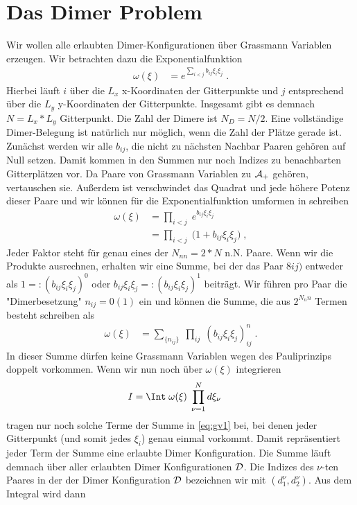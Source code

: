  
\section {Das Dimer Problem}

Wir wollen alle erlaubten Dimer-Konfigurationen über Grassmann Variablen erzeugen.
Wir betrachten dazu die Exponentialfunktion
\begin{align*}
    \omega(\xi) &= e^{\sum_{i<j} b_{ij} \xi_i\xi_j}\;.
\end{align*}
Hierbei läuft $i$ über die $L_x$ x-Koordinaten der Gitterpunkte und $j$ entsprechend über die 
$L_y$ y-Koordinaten der Gitterpunkte. Insgesamt gibt es demnach  $N=L_x*L_y$ Gitterpunkt. Die Zahl der Dimere ist $N_D=N/2$. Eine vollständige Dimer-Belegung ist
natürlich nur möglich, wenn die Zahl der Plätze gerade ist.
Zunächst werden wir alle $b_{ij}$, die nicht zu nächsten Nachbar Paaren gehören auf Null setzen. Damit kommen in den Summen nur noch Indizes zu 
benachbarten Gitterplätzen vor.
Da Paare von Grassmann Variablen  zu ${\cal A}_+$ gehören, vertauschen sie. Außerdem ist verschwindet das Quadrat und jede höhere 
Potenz dieser Paare und wir können für die Exponentialfunktion umformen in
schreiben
\begin{align*}
    \omega(\xi) &= \prod_{i<j}\; e^{b_{ij} \xi_i\xi_j}  \\
    &= \prod_{i<j}\;\bigg(1 + b_{ij}\xi_i\xi_j    \bigg)\;,
\end{align*}
Jeder Faktor steht für genau eines der $N_{nn}=2*N$ n.N. Paare.
Wenn wir die Produkte ausrechnen, erhalten 
wir eine Summe, bei der das Paar $8ij)$ entweder als $1=:(b_{ij} \xi_i\xi_j)^0$ oder $b_{ij} \xi_i\xi_j=:(b_{ij} \xi_i\xi_j)^1$ beiträgt. Wir führen
pro Paar die "Dimerbesetzung" $n_{ij}=0 (1)$ ein und können die Summe, die aus $2^{N_nn}$ Termen besteht schreiben als
\begin{align}\label{eq:gv1}
    \omega(\xi) &= \sum_{\{n_{ij} \}}\; \prod_{ij}\;(b_{ij}\xi_i\xi_j)^n_{ij}\;.
\end{align}
In dieser Summe dürfen keine Grassmann Variablen wegen des Pauliprinzips doppelt vorkommen.
Wenn wir nun noch über $\omega(\xi)$ integrieren
\begin{align*}
    I &=\Int\;\omega(\xi)\;\prod_{\nu=1}^N d\xi_\nu\;
\end{align*}
tragen nur noch solche Terme der Summe in \eqref{eq:gv1} bei, bei denen jeder Gitterpunkt (und somit jedes $\xi_i$) genau einmal vorkommt. Damit repräsentiert
jeder Term der Summe eine erlaubte Dimer Konfiguration. Die Summe läuft demnach über aller erlaubten Dimer Konfigurationen ${\cal D}$. Die Indizes des $\nu$-ten Paares 
in der der Dimer Konfiguration ${\cal D}$ bezeichnen wir mit $(d^\nu_1,d^\nu_2)$. Aus dem Integral wird dann

